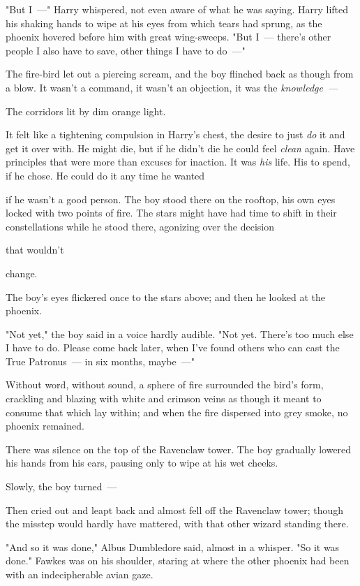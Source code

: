 "But I~---" Harry whispered, not even aware of what he was saying. Harry lifted
his shaking hands to wipe at his eyes from which tears had sprung, as the
phoenix hovered before him with great wing-sweeps. "But I~--- there's other
people I also have to save, other things I have to do~---"

The fire-bird let out a piercing scream, and the boy flinched back as though
from a blow. It wasn't a command, it wasn't an objection, it was the
\emph{knowledge~--- }

The corridors lit by dim orange light.

It felt like a tightening compulsion in Harry's chest, the desire to just
\emph{do} it and get it over with. He might die, but if he didn't die he could
feel \emph{clean} again. Have principles that were more than excuses for
inaction. It was \emph{his} life. His to spend, if he chose. He could do it any
time he wanted{\el}

{\el} if he wasn't a good person.
\sbreak
The boy stood there on the rooftop, his own eyes locked with two points of
fire. The stars might have had time to shift in their constellations while he
stood there, agonizing over the decision{\el}

{\el} that wouldn't{\el}

{\el} change.

The boy's eyes flickered once to the stars above; and then he looked at the
phoenix.

"Not yet," the boy said in a voice hardly audible. "Not yet. There's too much
else I have to do. Please come back later, when I've found others who can cast
the True Patronus~--- in six months, maybe~---"

Without word, without sound, a sphere of fire surrounded the bird's form,
crackling and blazing with white and crimson veins as though it meant to
consume that which lay within; and when the fire dispersed into grey smoke, no
phoenix remained.

There was silence on the top of the Ravenclaw tower. The boy gradually lowered
his hands from his ears, pausing only to wipe at his wet cheeks.

Slowly, the boy turned~---

Then cried out and leapt back and almost fell off the Ravenclaw tower; though
the misstep would hardly have mattered, with that other wizard standing there.

"And so it was done," Albus Dumbledore said, almost in a whisper. "So it was
done." Fawkes was on his shoulder, staring at where the other phoenix had been
with an indecipherable avian gaze.

